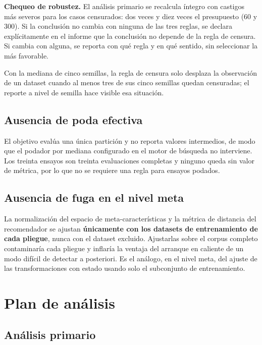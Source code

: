 \documentclass[11pt,letterpaper]{article}
\begin{document}
\textbf{Chequeo de robustez.} El análisis primario se recalcula íntegro con
castigos más severos para los casos censurados: dos veces y diez veces el
presupuesto ($60$ y $300$). Si la conclusión no cambia con ninguna de las tres
reglas, se declara explícitamente en el informe que la conclusión no depende de
la regla de censura. Si cambia con alguna, se reporta con qué regla y en qué
sentido, sin seleccionar la más favorable.

Con la mediana de cinco semillas, la regla de censura solo desplaza la observación
de un dataset cuando al menos tres de sus cinco semillas quedan censuradas; el
reporte a nivel de semilla hace visible esa situación.

\subsection{Ausencia de poda efectiva}

El objetivo evalúa una única partición y no reporta valores intermedios, de modo
que el podador por mediana configurado en el motor de búsqueda no interviene.
Los treinta ensayos son treinta evaluaciones completas y ninguno queda sin valor
de métrica, por lo que no se requiere una regla para ensayos podados.

\subsection{Ausencia de fuga en el nivel meta}

La normalización del espacio de meta-características y la métrica de distancia
del recomendador se ajustan \textbf{únicamente con los datasets de entrenamiento
de cada pliegue}, nunca con el dataset excluido. Ajustarlas sobre el corpus
completo contaminaría cada pliegue y inflaría la ventaja del arranque en caliente
de un modo difícil de detectar a posteriori. Es el análogo, en el nivel meta, del
ajuste de las transformaciones con estado usando solo el subconjunto de
entrenamiento.

\section{Plan de análisis}
\label{sec:analisis}

\subsection{Análisis primario}
\end{document}
